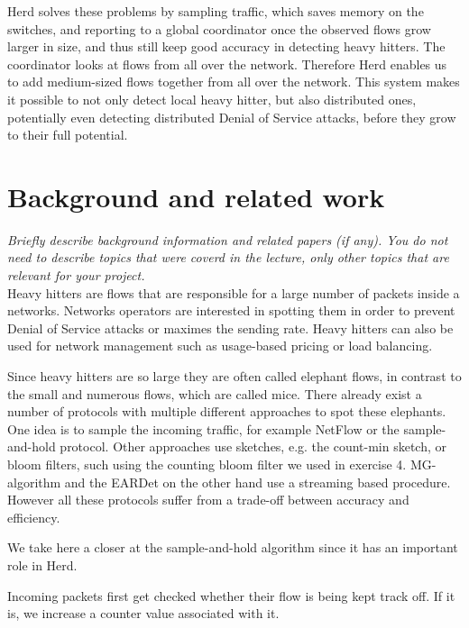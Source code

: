 \documentclass[11pt,oneside,a4paper]{article}
\newcommand{\hint}[1]{{\color{blue} \em #1}}
\begin{document}
Herd solves these problems by sampling traffic, which saves memory on the switches, and reporting to a global coordinator once the observed flows grow larger in size, and thus still keep good accuracy in detecting heavy hitters. The coordinator looks at flows from all over the network. Therefore Herd enables us to add medium-sized flows together from all over the network. This system makes it possible to not only detect local heavy hitter, but also distributed ones, potentially even detecting distributed Denial of Service attacks, before they grow to their full potential.


\section{Background and related work}
\hint{Briefly describe background information and related papers (if any). You do not need to describe topics that were coverd in the lecture, only other topics that are relevant for your project.} \\
Heavy hitters are flows that are responsible for a large number of packets inside a networks. Networks operators are interested in spotting them in order to prevent Denial of Service attacks or maximes the sending rate. Heavy hitters can also be used for network management such as usage-based pricing or load balancing.

Since heavy hitters are so large they are often called elephant flows, in contrast to the small and numerous flows, which are called mice. There already exist a number of protocols with multiple different approaches to spot these elephants. One idea is to sample the incoming traffic, for example NetFlow\cite{claise2004netflow} or the sample-and-hold protocol\cite{estan2003sample}. Other approaches use sketches, e.g. the count-min sketch\cite{cormode2003countmin}, or bloom filters, such using the counting bloom filter we used in exercise 4. MG-algorithm\cite{mg1982repeat} and the EARDet\cite{wu2014eardet} on the other hand use a streaming based procedure. 
However all these protocols suffer from a trade-off between accuracy and efficiency.

We take here a closer at the sample-and-hold algorithm\cite{estan2003sample} since it has an important role in Herd.

Incoming packets first get checked whether their flow is being kept track off. If it is, we increase a counter value associated with it.
\end{document}
